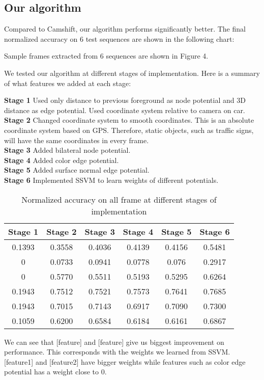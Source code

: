 \documentclass[10pt,twocolumn,letterpaper]{article}
\begin{document}
\subsection{Our algorithm}
Compared to Camshift, our algorithm performs significantly better. The final
normalized accuracy on 6 test sequences are shown in the following chart:

Sample frames extracted from 6 sequences are shown in Figure 4.

We tested our algorithm at different stages of implementation. Here is a summary of what features we added at each stage:

\indent\textbf{Stage 1} Used only distance to previous foreground as node potential and 
3D distance as edge potential. Used coordinate system relative to camera on
car.\\
\indent\textbf{Stage 2} Changed coordinate system to smooth coordinates. This is an
absolute coordinate system based on GPS. Therefore, static objects, such as
traffic signs, will have the same coordinates in every frame.\\
\indent\textbf{Stage 3} Added bilateral node potential.\\
\indent\textbf{Stage 4} Added color edge potential.\\
\indent\textbf{Stage 5} Added surface normal edge potential.\\
\indent\textbf{Stage 6} Implemented SSVM to learn weights of different potentials.


\begin{table}[H]
\centering
\caption{Normalized accuracy on all frame at different stages of implementation}
\begin{tabular}{ c|c|c|c|c|c }
Stage 1    &   Stage 2 & Stage 3 &  Stage 4 & Stage 5 & Stage 6 \\
\hline
\hline
0.1393     &     0.3558  &    0.4036   & 0.4139     &  0.4156       &  0.5481\\
0     &     0.0733    &    0.0941   & 0.0778     &  0.076         &  0.2917\\
0     &     0.5770  &    0.5511   & 0.5193     &  0.5295       &  0.6264\\
0.1943    &     0.7512  &    0.7521   & 0.7573     &  0.7641       &   0.7685 \\
0.1943     &     0.7015  &    0.7143   & 0.6917     &  0.7090	    &  0.7300\\
0.1059     &     0.6200  &    0.6584   & 0.6184     &  0.6161       &  0.6867 \\
\hline
\end{tabular}
\end{table}
We can see that [feature] and [feature] give us biggest improvement on
performance. This corresponds with the weights we learned from
SSVM. [feature1] and [feature2] have bigger weights while features such
as color edge potential has a weight close to 0.
\end{document}
